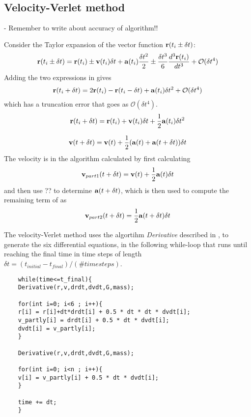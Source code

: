 \subsection{Velocity-Verlet method}
\label{sec:methodVV}
- Remember to write about accuracy of algorithm!!

Consider the Taylor expansion of the vector function $\mbox{\textbf{r}}(t_i \pm \delta t)$:
\begin{align}
	\mbox{\textbf{r}}(t_i \pm \delta t) = \mbox{\textbf{r}}(t_i) \pm \mbox{\textbf{v}} (t_i) \delta t
	+ \mbox{\textbf{a}} (t_i) \frac{\delta t ^2}{2}  \pm \frac{\delta t ^3}{6} \frac{d^3 \mbox{\textbf{r}}(t_i)}{dt^3} + \mathcal{O}(\delta t ^4 )
	\label{eq:TaylorExpVVmethod}
\end{align}
Adding the two expressions in  gives
\begin{align}
	\mbox{\textbf{r}} (t_i +\delta t) = 2\mbox{\textbf{r}} (t_i) - \mbox{\textbf{r}} (t_i -\delta t)  + \mbox{\textbf{a}} (t_i ) \delta t^2 + \mathcal{O} (\delta t ^4 )
\end{align}
which has a truncation error that goes as $\mathcal{O} (\delta t ^4 )$.
\begin{align}
	\mbox{\textbf{r}}(t_i+\delta t) = \mbox{\textbf{r}}(t_i) + \mbox{\textbf{v}} (t_i) \delta t + \frac{1}{2} \mbox{\textbf{a}} (t_i) \delta t^2 
	\label{eq:VVmethodNextPosition}
\end{align}

\begin{align}
	\mbox{\textbf{v}} (t + \delta t) = \mbox{\textbf{v}} (t) + \frac{1}{2} ( \mbox{\textbf{a}} (t) + \mbox{\textbf{a}} (t + \delta t) ) \delta t
	\label{eq:VVmethodNextVelocity}
\end{align}
The velocity is in the algorithm calculated  by first calculating 
\begin{align}
	\mbox{\textbf{v}}_{part1} (t + \delta t) = \mbox{\textbf{v}} (t) + \frac{1}{2}  \mbox{\textbf{a}} (t)  \delta t
	\label{eq:VVmethodNextVelocityPart1}
\end{align}
and then use ??  to determine $\mbox{\textbf{a}} (t + \delta t)$, which is then used to compute the remaining term of  as 
\begin{align}
	\mbox{\textbf{v}}_{part2} (t + \delta t) = \frac{1}{2} \mbox{\textbf{a}} (t + \delta t) \delta t
	\label{eq:VVmethodNextVelocityPart2}
\end{align}

The velocity-Verlet method uses the algortihm \textit{Derivative} described in , to generate the six differential equations, in the following while-loop that runs until reaching the final time in time steps of length $\delta t = (t_{initial} - t_{final})/(\# time steps)$.
\begin{lstlisting}
    while(time<=t_final){
    Derivative(r,v,drdt,dvdt,G,mass);

    for(int i=0; i<6 ; i++){
    r[i] = r[i]+dt*drdt[i] + 0.5 * dt * dt * dvdt[i];
    v_partly[i] = drdt[i] + 0.5 * dt * dvdt[i];
    dvdt[i] = v_partly[i];
    }

    Derivative(r,v,drdt,dvdt,G,mass);

    for(int i=0; i<n ; i++){
    v[i] = v_partly[i] + 0.5 * dt * dvdt[i];
    }

    time += dt;
    }
\end{lstlisting}